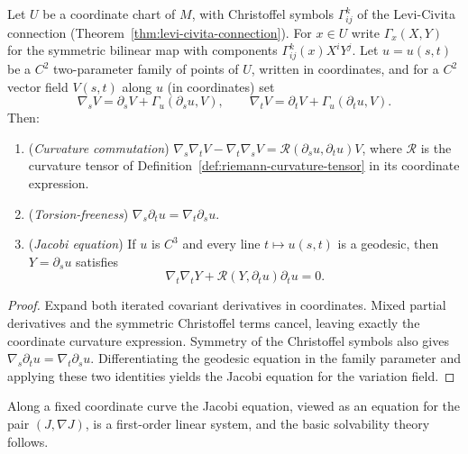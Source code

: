 \begin{lemma}
\label{lem:covariant-commutation-jacobi}





Let $U$ be a coordinate chart of $M$, with Christoffel symbols
$\Gamma^k_{ij}$ of the Levi-Civita connection
(Theorem~\ref{thm:levi-civita-connection}). For $x\in U$ write
$\Gamma_x(X,Y)$ for the symmetric bilinear map with components
$\Gamma^k_{ij}(x)X^iY^j$. Let $u=u(s,t)$ be a $C^2$ two-parameter
family of points of $U$, written in coordinates, and for a $C^2$
vector field $V(s,t)$ along $u$ (in coordinates) set
$$\nabla_sV=\partial_sV+\Gamma_u(\partial_su,V),\qquad
\nabla_tV=\partial_tV+\Gamma_u(\partial_tu,V).$$
Then:
\begin{enumerate}
\item ({\em Curvature commutation})
$\nabla_s\nabla_tV-\nabla_t\nabla_sV
={\mathcal R}(\partial_su,\partial_tu)V$, where ${\mathcal R}$ is
the curvature tensor of
Definition~\ref{def:riemann-curvature-tensor} in its coordinate
expression.
\item ({\em Torsion-freeness})
$\nabla_s\partial_tu=\nabla_t\partial_su$.
\item ({\em Jacobi equation}) If $u$ is $C^3$ and every line
$t\mapsto u(s,t)$ is a geodesic, then $Y=\partial_su$ satisfies
$$\nabla_t\nabla_tY+{\mathcal R}(Y,\partial_tu)\partial_tu=0.$$
\end{enumerate}
\end{lemma}

\begin{proof}
\sketch

Expand both iterated covariant derivatives in coordinates. Mixed partial derivatives and the symmetric Christoffel terms cancel, leaving exactly the coordinate curvature expression. Symmetry of the Christoffel symbols also gives $\nabla_s\partial_tu=\nabla_t\partial_su$. Differentiating the geodesic equation in the family parameter and applying these two identities yields the Jacobi equation for the variation field.
\end{proof}

Along a fixed coordinate curve the Jacobi equation, viewed as an
equation for the pair $(J,\nabla J)$, is a first-order linear
system, and the basic solvability theory follows.

